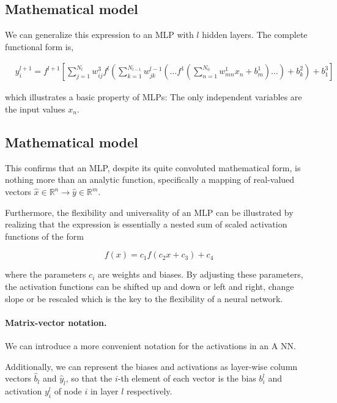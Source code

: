\documentclass[%
oneside,                 %
final,                   %
10pt]{article}
\begin{document}
\subsection*{Mathematical model}

We can generalize this expression to an MLP with $l$ hidden
layers. The complete functional form is,

\begin{align}
&y^{l+1}_i = f^{l+1}\left[\!\sum_{j=1}^{N_l} w_{ij}^3 f^l\left(\sum_{k=1}^{N_{l-1}}w_{jk}^{l-1}\left(\dots f^1\left(\sum_{n=1}^{N_0} w_{mn}^1 x_n+ b_m^1\right)\dots\right)+b_k^2\right)+b_1^3\right] &&
 \label{completeNN}
\end{align}

which illustrates a basic property of MLPs: The only independent
variables are the input values $x_n$.

\subsection*{Mathematical model}

This confirms that an MLP, despite its quite convoluted mathematical
form, is nothing more than an analytic function, specifically a
mapping of real-valued vectors $\hat{x} \in \mathbb{R}^n \rightarrow
\hat{y} \in \mathbb{R}^m$.

Furthermore, the flexibility and universality of an MLP can be
illustrated by realizing that the expression is essentially a nested
sum of scaled activation functions of the form

\begin{equation}
 f(x) = c_1 f(c_2 x + c_3) + c_4
\end{equation}

where the parameters $c_i$ are weights and biases. By adjusting these
parameters, the activation functions can be shifted up and down or
left and right, change slope or be rescaled which is the key to the
flexibility of a neural network.

\paragraph{Matrix-vector notation.}
We can introduce a more convenient notation for the activations in an A NN. 

Additionally, we can represent the biases and activations
as layer-wise column vectors $\hat{b}_l$ and $\hat{y}_l$, so that the $i$-th element of each vector 
is the bias $b_i^l$ and activation $y_i^l$ of node $i$ in layer $l$ respectively. 
\end{document}

